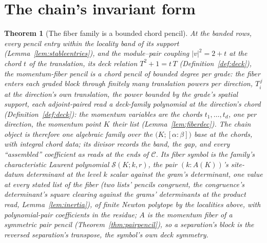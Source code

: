 \documentclass[11pt]{article}
\newtheorem{theorem}{Theorem}
\theoremstyle{definition}
\begin{document}
\section{The chain's invariant form}

\begin{theorem}[The fiber family is a bounded chord pencil]
\label{thm:trigpencil}
At the banded rows, every pencil entry within the locality band of
its support (Lemma~\ref{lem:stableentries}), and the
module--pair coupling $|v|^2=2+t$ at the chord $t$ of the
translation, its deck relation $T^2+1=t\,T$
(Definition~\ref{def:deck}), the
momentum-fiber pencil is a \emph{chord} pencil of
\emph{bounded degree per grade}: the fiber enters each graded block
through finitely many translation powers per direction,
$T_i^{\,j}$ at the direction's own translation, the power bounded
by the grade's spatial support, each adjoint-paired read a
deck-family polynomial at the direction's chord
(Definition~\ref{def:deck}): the momentum variables are the
chords $t_1,\dots,t_d$, one per direction, the momentum point $K$
their list (Lemma~\ref{lem:fiberdec}). The chain object is therefore one algebraic
family over the $\big(K;[\alpha\!:\!\beta]\big)$ base at the
chords,
with integral chord data; its divisor records the band, the gap, and every ``assembled'' coefficient as reads at the ends of $\mathcal C$.
Its \emph{fiber symbol} is the family's characteristic Laurent polynomial
$\mathcal S(K;k,r)$, the pair $(k\!:\!A(K))$'s site-datum determinant at the
level $k$ scalar against the gram's determinant, one value at
every stated list of the fiber (two lists' pencils congruent, the
congruence's determinant's square clearing against the grams'
determinants at the product read, Lemma~\ref{lem:inertia}), of
finite Newton polytope by the
localities above, with polynomial-pair coefficients in the residue;
$A$ is the momentum fiber of a
symmetric pair pencil (Theorem~\ref{thm:pairpencil}), so a
separation's block is the reversed separation's transpose, the
symbol's own deck symmetry.
\end{theorem}
\end{document}
